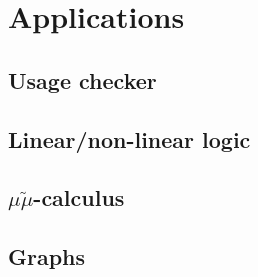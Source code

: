 \chapter{Applications}\label{sec:applications}

\section{Usage checker}\label{sec:usage-checker}
\section{Linear/non-linear logic}\label{sec:lnl}

\section{$\mu\tilde\mu$-calculus}\label{sec:mmt}
\section{Graphs}\label{sec:graphs}
